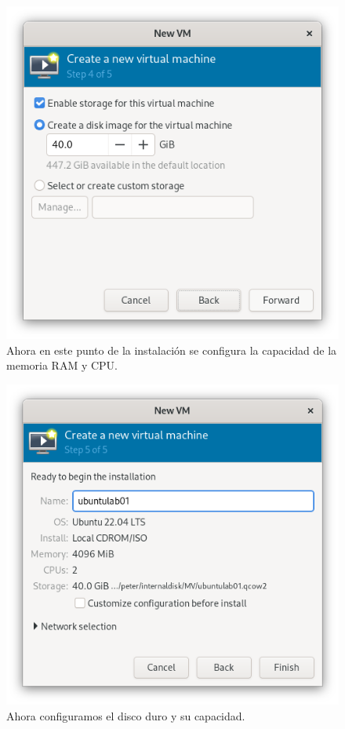\begin{figure}[H]
	\centering
	\includegraphics[scale=0.40]{03}
	\caption{Ahora en este punto de la instalación se configura la capacidad de la memoria RAM y CPU.}
\end{figure}

\begin{figure}[H]
	\centering
	\includegraphics[scale=0.40]{04}
	\caption{Ahora configuramos el disco duro y su capacidad.}
\end{figure}

